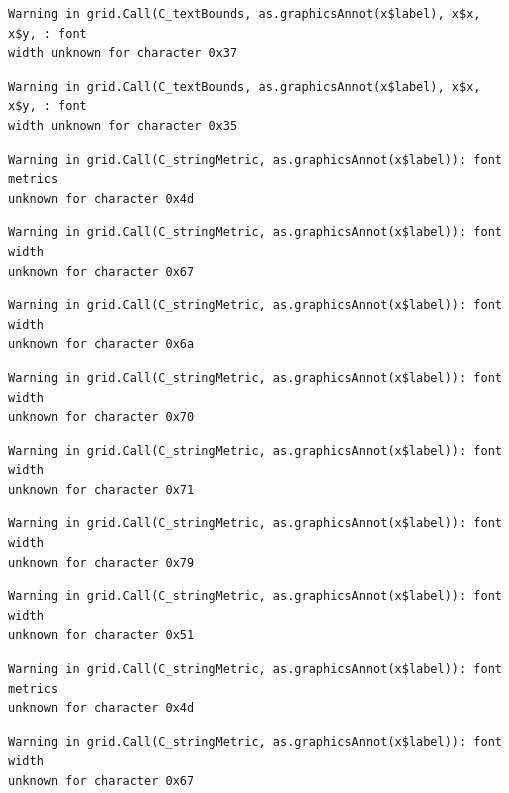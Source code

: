 \documentclass[
  letterpaper,
]{scrbook}
\begin{document}
\begin{verbatim}
Warning in grid.Call(C_textBounds, as.graphicsAnnot(x$label), x$x, x$y, : font
width unknown for character 0x37
\end{verbatim}

\begin{verbatim}
Warning in grid.Call(C_textBounds, as.graphicsAnnot(x$label), x$x, x$y, : font
width unknown for character 0x35
\end{verbatim}

\begin{verbatim}
Warning in grid.Call(C_stringMetric, as.graphicsAnnot(x$label)): font metrics
unknown for character 0x4d
\end{verbatim}

\begin{verbatim}
Warning in grid.Call(C_stringMetric, as.graphicsAnnot(x$label)): font width
unknown for character 0x67
\end{verbatim}

\begin{verbatim}
Warning in grid.Call(C_stringMetric, as.graphicsAnnot(x$label)): font width
unknown for character 0x6a
\end{verbatim}

\begin{verbatim}
Warning in grid.Call(C_stringMetric, as.graphicsAnnot(x$label)): font width
unknown for character 0x70
\end{verbatim}

\begin{verbatim}
Warning in grid.Call(C_stringMetric, as.graphicsAnnot(x$label)): font width
unknown for character 0x71
\end{verbatim}

\begin{verbatim}
Warning in grid.Call(C_stringMetric, as.graphicsAnnot(x$label)): font width
unknown for character 0x79
\end{verbatim}

\begin{verbatim}
Warning in grid.Call(C_stringMetric, as.graphicsAnnot(x$label)): font width
unknown for character 0x51
\end{verbatim}

\begin{verbatim}
Warning in grid.Call(C_stringMetric, as.graphicsAnnot(x$label)): font metrics
unknown for character 0x4d
\end{verbatim}

\begin{verbatim}
Warning in grid.Call(C_stringMetric, as.graphicsAnnot(x$label)): font width
unknown for character 0x67
\end{verbatim}
\end{document}
